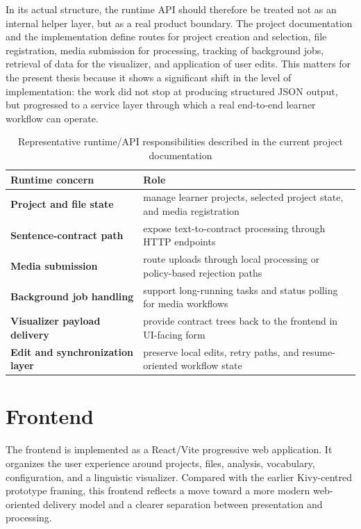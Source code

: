 \documentclass[12pt,a4paper,oneside]{report}
\begin{document}
In its actual structure, the runtime API should therefore be treated not as an internal helper layer, but as a real product boundary. The project documentation and the implementation define routes for project creation and selection, file registration, media submission for processing, tracking of background jobs, retrieval of data for the visualizer, and application of user edits. This matters for the present thesis because it shows a significant shift in the level of implementation: the work did not stop at producing structured JSON output, but progressed to a service layer through which a real end-to-end learner workflow can operate.

\begin{table}[H]
  \centering
  \caption{Representative runtime/API responsibilities described in the current project documentation}
  \begin{tabularx}{\textwidth}{>{\bfseries}p{4.1cm}X}
    \toprule
    Runtime concern & Role \\
    \midrule
    Project and file state & manage learner projects, selected project state, and media registration \\
    Sentence-contract path & expose text-to-contract processing through HTTP endpoints \\
    Media submission & route uploads through local processing or policy-based rejection paths \\
    Background job handling & support long-running tasks and status polling for media workflows \\
    Visualizer payload delivery & provide contract trees back to the frontend in UI-facing form \\
    Edit and synchronization layer & preserve local edits, retry paths, and resume-oriented workflow state \\
    \bottomrule
  \end{tabularx}
\end{table}

\section{Frontend}
The frontend is implemented as a React/Vite progressive web application. It organizes the user experience around projects, files, analysis, vocabulary, configuration, and a linguistic visualizer. Compared with the earlier Kivy-centred prototype framing, this frontend reflects a move toward a more modern web-oriented delivery model and a clearer separation between presentation and processing.
\end{document}
